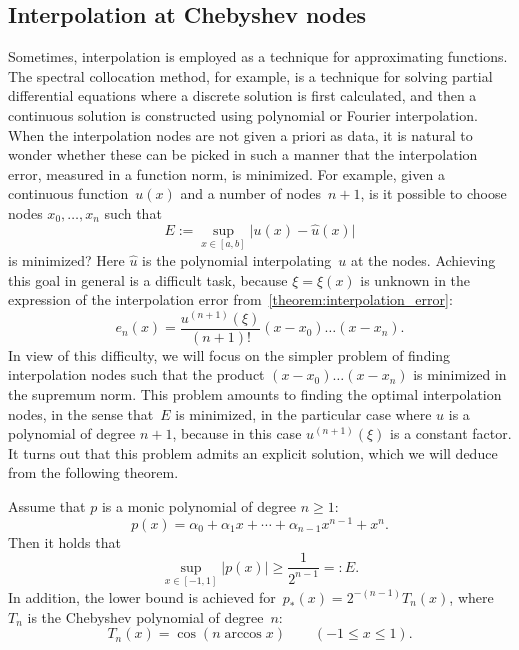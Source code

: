 \subsection{Interpolation at Chebyshev nodes}
Sometimes,
interpolation is employed as a technique for approximating functions.
The spectral collocation method, for example,
is a technique for solving partial differential equations
where a discrete solution is first calculated,
and then a continuous solution is constructed using polynomial or Fourier interpolation.
When the interpolation nodes are not given a priori as data,
it is natural to wonder whether these can be picked in such a manner that the interpolation error,
measured in a function norm, is minimized.
For example, given a continuous function~$u(x)$ and a number of nodes~$n+1$,
is it possible to choose nodes $x_0, \dotsc, x_n$ such that
\[
    E := \sup_{x \in [a, b]} \bigl\lvert u(x) - \widehat u(x) \bigr\rvert
\]
is minimized?
Here $\widehat u$ is the polynomial interpolating~$u$ at the nodes.
Achieving this goal in general is a difficult task,
because $\xi = \xi(x)$ is unknown in the expression of the interpolation error from~\cref{theorem:interpolation_error}:
\[
    e_n(x) = \frac{u^{(n+1)}(\xi)}{(n+1)!} (x-x_0) \dotsc (x - x_n).
\]
In view of this difficulty,
we will focus on the simpler problem of finding interpolation nodes
such that the product $(x-x_0) \dotsc (x - x_n)$ is minimized in the supremum norm.
This problem amounts to finding the optimal interpolation nodes,
in the sense that~$E$ is minimized,
in the particular case where $u$ is a polynomial of degree $n+1$,
because in this case $u^{(n+1)}(\xi)$ is a constant factor.
It turns out that this problem admits an explicit solution,
which we will deduce from the following theorem.
\begin{theorem}
    \label{theorem:minimum_infty_norm}
    Assume that $p$ is a monic polynomial of degree $n \geq 1$:
    \[
        p(x) = \alpha_0 + \alpha_1 x + \dotsb + \alpha_{n-1} x^{n-1} +  x^n.
    \]
    Then it holds that
    \begin{equation}
        \label{eq:chebychev_lower_bound}
        \sup_{x \in [-1, 1]} \bigl\lvert p(x) \bigr\rvert \geq \frac{1}{2^{n-1}} =: E.
    \end{equation}
    In addition, the lower bound is achieved for~$p_*(x) = 2^{-(n-1)} T_n(x)$,
    where $T_n$ is the Chebyshev polynomial of degree~$n$:
    \begin{equation}
        \label{eq:chebyshev_polynomial}
        T_n(x) = \cos(n\arccos x) \qquad (-1 \leq x \leq 1).
    \end{equation}
\end{theorem}
